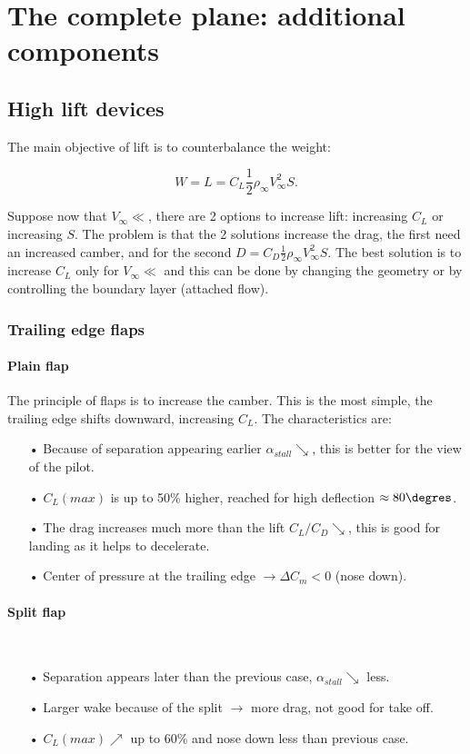 
\chapter{The complete plane: additional components}
\section{High lift devices}	
	The main objective of lift is to counterbalance the weight: 
	
	\begin{equation}
	W = L = C_L \frac{1}{2} \rho _\infty V_\infty ^2 S.
	\end{equation}
	
	Suppose now that $V_\infty \ll$, there are 2 options to increase lift: increasing $C_L$ or increasing $S$. The problem is that the 2 solutions increase the drag, the first need an increased camber, and for the second $D = C_D \frac{1}{2} \rho _\infty V_\infty ^2 S$. The best solution is to increase $C_L$ only for $V_\infty \ll$ and this can be done by changing the geometry or by controlling the boundary layer (attached flow). 
	
\subsection{Trailing edge flaps}
\subsubsection{Plain flap}
	The principle of flaps is to increase the camber. This is the most simple, the trailing edge shifts downward, increasing $C_L$. The characteristics are: 
	\begin{itemize}
	\item[•] Because of separation appearing earlier $\alpha _{stall} \searrow$, this is better for the view of the pilot. 
	\item[•] $C_L(max)$ is up to 50\% higher, reached for high deflection $\approx 80\degres$.
	\item[•] The drag increases much more than the lift $C_L/C_D \searrow$, this is good for landing as it helps to decelerate.
	\item[•] Center of pressure at the trailing edge $\rightarrow \Delta C_m<0$ (nose down). 
	\end{itemize}
	
\subsubsection{Split flap}
	 \ \\
	\begin{itemize}
	\item[•] Separation appears later than the previous case, $\alpha _{stall} \searrow$ less. 
	\item[•] Larger wake because of the split $\rightarrow$ more drag, not good for take off. 
	\item[•] $C_L(max) \nearrow$ up to 60\% and nose down less than previous case. 
	\end{itemize}
	
